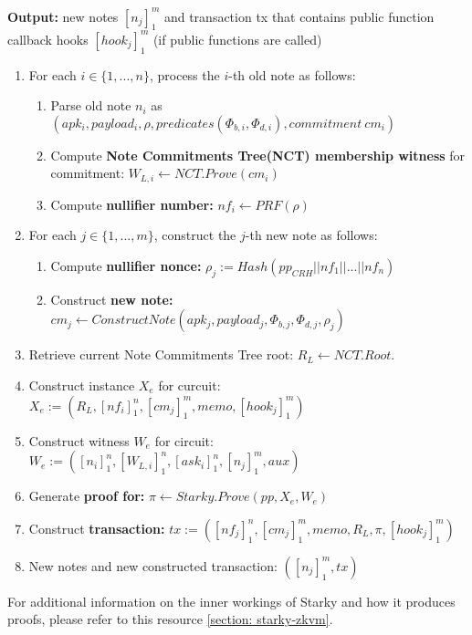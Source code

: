 \textbf{Output:} new notes $[n_j]_1^m$ and transaction tx that contains public function callback hooks $[hook_j]_1^m$ (if public functions are called)

\begin{enumerate}
    \item For each $i \in \{1, ..., n\}$, process the $i$-th old note as follows:
        \begin{enumerate}
            \item Parse old note $n_i$ as $(apk_i, payload_i, \rho, predicates(\Phi_{b,i}, \Phi_{d,i}), commitment \ cm_i)$
            \item Compute \textbf{Note Commitments Tree(NCT) membership witness} for commitment: $W_{L,i} \leftarrow NCT.Prove(cm_i)$
            \item Compute \textbf{nullifier number:} $nf_i \leftarrow PRF(\rho)$
        \end{enumerate}
    \item For each $j \in \{1, ..., m\}$, construct the $j$-th new note as follows:
        \begin{enumerate}
            \item Compute \textbf{nullifier nonce:} $\rho_j := Hash(pp_{CRH} || nf_1 || ... || nf_n)$
            \item Construct \textbf{new note:} $cm_j \leftarrow ConstructNote(apk_j, payload_j, \Phi_{b,j}, \Phi_{d,j}, \rho_j)$
        \end{enumerate}
    \item Retrieve current Note Commitments Tree root: $R_L \leftarrow NCT.Root$.
    \item Construct instance $X_e$ for curcuit: $X_e := (R_L, [nf_i]_1^n, [cm_j]_1^m, memo, [hook_j]_1^m)$
    \item Construct witness $W_e$ for circuit: $W_e := ([n_i]_1^n, [W_{L,i}]_1^n, [ask_i]_1^n, [n_j]_1^m, aux)$
    \item Generate \textbf{proof for:} $\pi \leftarrow Starky.Prove(pp, X_e, W_e)$
    \item Construct \textbf{transaction:} $tx := ([nf_j]_1^n, [cm_j]_1^m, memo, R_L, \pi, [hook_j]_1^m)$
    \item New notes and new constructed transaction: $([n_j]_1^m, tx)$
\end{enumerate}
\normalcolor{}

For additional information on the inner workings of Starky and how it produces proofs, please refer to this resource \ref{section: starky-zkvm}.